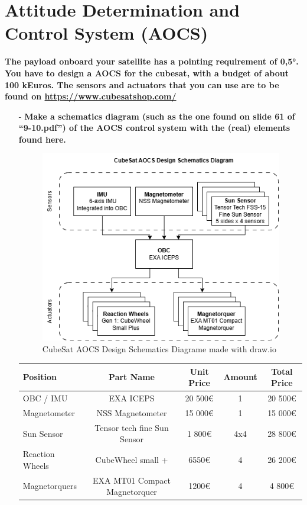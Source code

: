\section{Attitude Determination and Control System (AOCS)}

\textbf{The payload onboard your satellite has a pointing requirement of 0,5°. You have to design a AOCS for the cubesat, with a budget of about 100 kEuros. The sensors and actuators that you can use are to be found on \url{https://www.cubesatshop.com/}}

\begin{itemize}
    \item[-] \textbf{Make a schematics diagram (such as the one found on slide 61 of “9-10.pdf”) of the AOCS control system with the (real) elements found here. } 

    \begin{figure}[h]
        \centering
        \includegraphics[width=0.8\linewidth]{Doc/Graphics/AOCS hardware diagram.png}
        \caption{CubeSat AOCS Design Schematics Diagrame made with draw.io}
        \label{fig:enter-label}
    \end{figure}

    \vfill
    
    \begin{table}[h]
        \centering
        \begin{tabular}{|l|c|c|c|c|}
        \hline
        \textbf{Position}&\textbf{Part Name}&  \textbf{Unit Price}&  \textbf{Amount}&  \textbf{Total Price}\\
        \hline \hline
        OBC / IMU&EXA ICEPS&  20 500€&  1&  20 500€\\ 
        Magnetometer&NSS Magnetometer&  15 000€&  1&  15 000€\\ 
        Sun Sensor&Tensor tech fine Sun Sensor& 1 800€& 4x4& 28 800€\\
        Reaction Wheels&CubeWheel small +& 6550€& 4& 26 200€\\
        Magnetorquers& EXA MT01 Compact Magnetorquer& 1200€& 4& 4 800€\\


\end{tabular}
\end{table}
\end{itemize}
